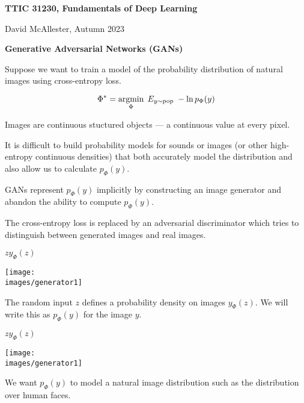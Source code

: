 





{\Huge

  \centerline{\bf TTIC 31230, Fundamentals of Deep Learning}
  \bigskip
  \centerline{David McAllester, Autumn 2023}
  \vfill
  \centerline{\bf Generative Adversarial Networks (GANs)}
\vfill
\vfill



Suppose we want to train a model of the probability distribution of natural images using cross-entropy loss.

\vfill
$$\Phi^* = \operatorname*{argmin}_\Phi \;E_{y \sim \mathrm{pop}}\;-\ln p_\Phi(y)$$

\vfill
Images are continuous stuctured objects --- a continuous value at every pixel.

\vfill
It is difficult to build probability models for sounds or images (or other high-entropy continuous densities)
that both accurately model the distribution and also allow us to calculate $p_\Phi(y)$.


GANs represent $p_\Phi(y)$ implicitly by constructing an image generator and abandon the ability to compute $p_\Phi(y)$.

\vfill
The cross-entropy loss is replaced by an adversarial discriminator which tries to distinguish between generated images and real images.


\bigskip
\centerline{$z$\hspace{5in}$y_\Phi(z)$}
\centerline{\texttt{[image: \\images/generator1]}}

\bigskip
The random input $z$ defines a probability density on images $y_\Phi(z)$.  We will write this as $p_\Phi(y)$ for the image $y$.


\bigskip
\centerline{$z$\hspace{5in}$y_\Phi(z)$}
\centerline{\texttt{[image: \\images/generator1]}}

\bigskip
We want $p_\Phi(y)$ to model a natural image distribution such as the distribution over human faces.



}
